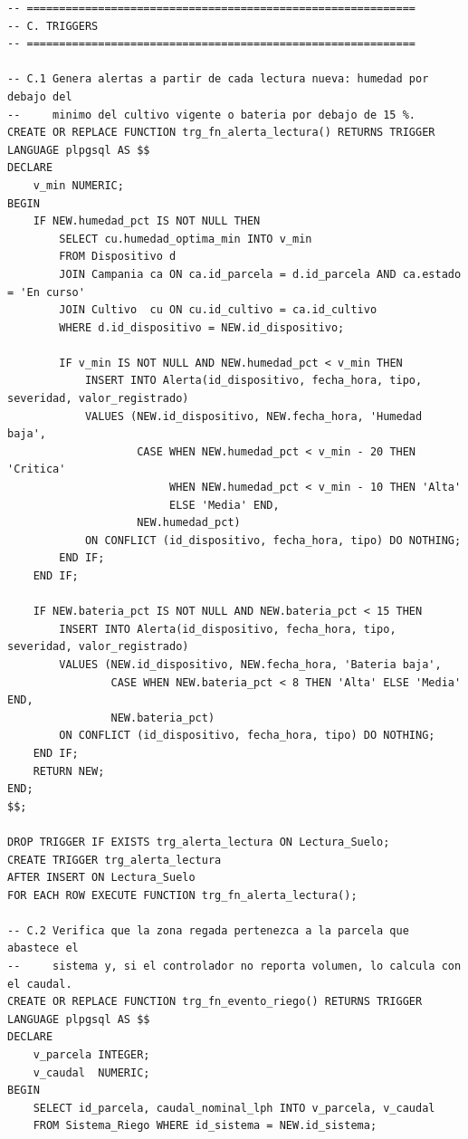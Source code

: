 \documentclass[11pt,letterpaper]{article}
\begin{document}
\begin{lstlisting}[style=sql]
-- ============================================================
-- C. TRIGGERS
-- ============================================================

-- C.1 Genera alertas a partir de cada lectura nueva: humedad por debajo del
--     minimo del cultivo vigente o bateria por debajo de 15 %.
CREATE OR REPLACE FUNCTION trg_fn_alerta_lectura() RETURNS TRIGGER
LANGUAGE plpgsql AS $$
DECLARE
    v_min NUMERIC;
BEGIN
    IF NEW.humedad_pct IS NOT NULL THEN
        SELECT cu.humedad_optima_min INTO v_min
        FROM Dispositivo d
        JOIN Campania ca ON ca.id_parcela = d.id_parcela AND ca.estado = 'En curso'
        JOIN Cultivo  cu ON cu.id_cultivo = ca.id_cultivo
        WHERE d.id_dispositivo = NEW.id_dispositivo;

        IF v_min IS NOT NULL AND NEW.humedad_pct < v_min THEN
            INSERT INTO Alerta(id_dispositivo, fecha_hora, tipo, severidad, valor_registrado)
            VALUES (NEW.id_dispositivo, NEW.fecha_hora, 'Humedad baja',
                    CASE WHEN NEW.humedad_pct < v_min - 20 THEN 'Critica'
                         WHEN NEW.humedad_pct < v_min - 10 THEN 'Alta'
                         ELSE 'Media' END,
                    NEW.humedad_pct)
            ON CONFLICT (id_dispositivo, fecha_hora, tipo) DO NOTHING;
        END IF;
    END IF;

    IF NEW.bateria_pct IS NOT NULL AND NEW.bateria_pct < 15 THEN
        INSERT INTO Alerta(id_dispositivo, fecha_hora, tipo, severidad, valor_registrado)
        VALUES (NEW.id_dispositivo, NEW.fecha_hora, 'Bateria baja',
                CASE WHEN NEW.bateria_pct < 8 THEN 'Alta' ELSE 'Media' END,
                NEW.bateria_pct)
        ON CONFLICT (id_dispositivo, fecha_hora, tipo) DO NOTHING;
    END IF;
    RETURN NEW;
END;
$$;

DROP TRIGGER IF EXISTS trg_alerta_lectura ON Lectura_Suelo;
CREATE TRIGGER trg_alerta_lectura
AFTER INSERT ON Lectura_Suelo
FOR EACH ROW EXECUTE FUNCTION trg_fn_alerta_lectura();

-- C.2 Verifica que la zona regada pertenezca a la parcela que abastece el
--     sistema y, si el controlador no reporta volumen, lo calcula con el caudal.
CREATE OR REPLACE FUNCTION trg_fn_evento_riego() RETURNS TRIGGER
LANGUAGE plpgsql AS $$
DECLARE
    v_parcela INTEGER;
    v_caudal  NUMERIC;
BEGIN
    SELECT id_parcela, caudal_nominal_lph INTO v_parcela, v_caudal
    FROM Sistema_Riego WHERE id_sistema = NEW.id_sistema;


\end{lstlisting}
\end{document}
